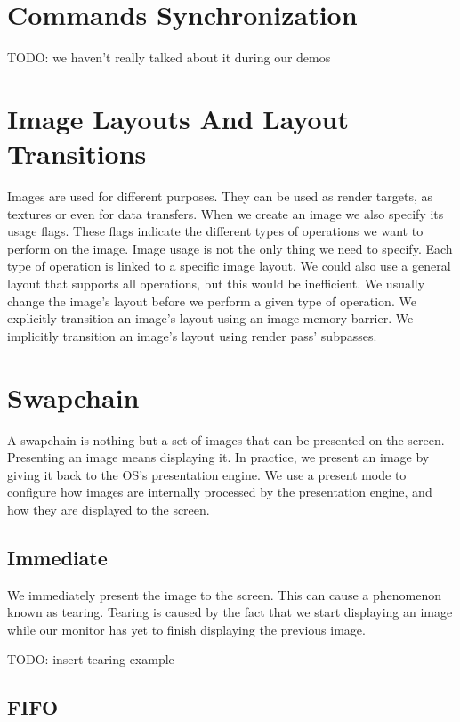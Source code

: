 \section{Commands Synchronization}

TODO: we haven't really talked about it during our demos

\section{Image Layouts And Layout Transitions}

Images are used for different purposes.
They can be used as render targets, as textures or even for data transfers.
When we create an image we also specify its usage flags.
These flags indicate the different types of operations we want to perform
on the image.
Image usage is not the only thing we need to specify.
Each type of operation is linked to a specific image layout.
We could also use a general layout that supports all operations, but this
would be inefficient.
We usually change the image's layout before we perform a given type of
operation.
We explicitly transition an image's layout using an image memory barrier.
We implicitly transition an image's layout using render pass' subpasses.

\section{Swapchain}

A swapchain is nothing but a set of images that can be presented on the screen.
Presenting an image means displaying it.
In practice, we present an image by giving it back to the OS's presentation engine.
We use a present mode to configure how images are internally processed by
the presentation engine, and how they are displayed to the screen.

\subsection{Immediate}

We immediately present the image to the screen.
This can cause a phenomenon known as tearing.
Tearing is caused by the fact that we start displaying an image
while our monitor has yet to finish displaying the previous image.

TODO: insert tearing example

\subsection{FIFO}

